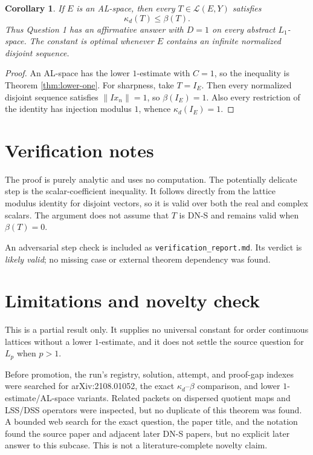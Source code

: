 \documentclass[11pt]{article}
\newtheorem{corollary}{Corollary}
\newcommand{\Lin}{\mathcal L}
\begin{document}
\begin{corollary}\label{cor:al}
If $E$ is an AL-space, then every $T\in\Lin(E,Y)$ satisfies
\[
  \kappa_d(T)\leq\beta(T).
\]
Thus Question 1 has an affirmative answer with $D=1$ on every abstract
$L_1$-space.  The constant is optimal whenever $E$ contains an infinite
normalized disjoint sequence.
\end{corollary}

\begin{proof}
An AL-space has the lower $1$-estimate with $C=1$, so the inequality is
Theorem \ref{thm:lower-one}.  For sharpness, take $T=I_E$.  Then every
normalized disjoint sequence satisfies $\|Ix_n\|=1$, so $\beta(I_E)=1$.
Also every restriction of the identity has injection modulus $1$, whence
$\kappa_d(I_E)=1$.
\end{proof}

\section*{Verification notes}

The proof is purely analytic and uses no computation.  The potentially
delicate step is the scalar-coefficient inequality.  It follows directly from
the lattice modulus identity for disjoint vectors, so it is valid over both
the real and complex scalars.  The argument does not assume that $T$ is
DN-S and remains valid when $\beta(T)=0$.

An adversarial step check is included as
\texttt{verification\_report.md}.  Its verdict is \emph{likely valid}; no
missing case or external theorem dependency was found.

\section*{Limitations and novelty check}

This is a partial result only.  It supplies no universal constant for order
continuous lattices without a lower $1$-estimate, and it does not settle the
source question for $L_p$ when $p>1$.

Before promotion, the run's registry, solution, attempt, and proof-gap indexes
were searched for arXiv:2108.01052, the exact $\kappa_d$--$\beta$
comparison, and lower $1$-estimate/AL-space variants.  Related packets on
dispersed quotient maps and LSS/DSS operators were inspected, but no duplicate
of this theorem was found.  A bounded web search for the exact question, the
paper title, and the notation found the source paper and adjacent later DN-S
papers, but no explicit later answer to this subcase.  This is not a
literature-complete novelty claim.
\end{document}
